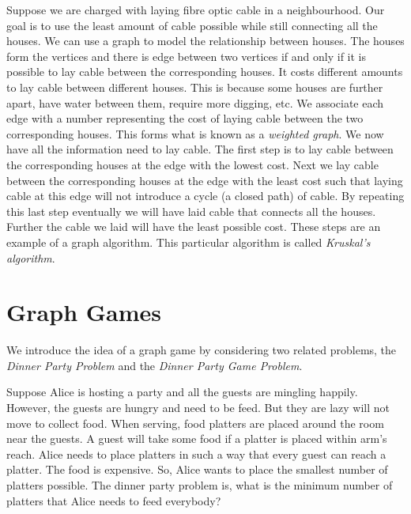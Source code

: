 Suppose we are charged with laying fibre optic cable in a neighbourhood. Our goal is to use the least amount of cable possible while still connecting all the houses. We can use a graph to model the relationship between houses. The houses form the vertices and there is edge between two vertices if and only if it is possible to lay cable between the corresponding houses.
It costs different amounts to lay cable between different houses. This is because some houses are further apart, have water between them, require more digging, etc. 
We associate each edge with a number representing the cost of laying cable between the two corresponding houses. This forms what is known as a \textit{weighted graph}. We now have all the information need to lay cable. The first step is to lay cable between the corresponding houses at the edge with the lowest cost. Next we lay cable between the corresponding houses at the edge with the least cost such that laying cable at this edge will not introduce a cycle (a closed path) of cable. By repeating this last step eventually we will have laid cable that connects all the houses. Further the cable we laid will have the least possible cost. These steps are an example of a graph algorithm. This particular algorithm is called \textit{Kruskal's algorithm}. 
 
 \section{Graph Games}  
We introduce the idea of a graph game by considering two related problems, the \textit{Dinner Party Problem} and the \textit{Dinner Party Game Problem}.

Suppose Alice is hosting a party and all the guests are mingling happily. However, the guests are hungry and need to be feed. But they are lazy will not move to collect food. When serving, food platters are placed around the room near the guests. A guest will take some food if a platter is placed within arm's reach. Alice needs to place platters in such a way that every guest can reach a platter. The food is expensive. So, Alice wants to place the smallest number of platters possible. The dinner party problem is, what is the minimum number of platters that Alice needs to feed everybody? 


